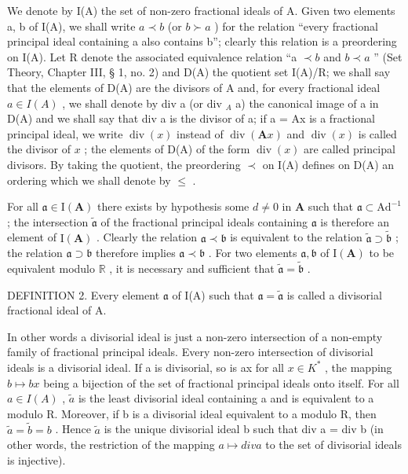 We denote by I(A) the set of non-zero fractional ideals of A. Given two elements a, b of I(A), we shall write \(a \prec b\) (or \(b \succ a\) ) for the relation ``every fractional principal ideal containing a also contains b''; clearly this relation is a preordering on I(A). Let R denote the associated equivalence relation ``a \(\prec b\) and \(b \prec a\) '' (Set Theory, Chapter III, § 1, no. 2) and D(A) the quotient set I(A)/R; we shall say that the elements of D(A) are the divisors of A and, for every fractional ideal \(a \in I(A)\) , we shall denote by div a (or div \(_{A}\) a) the canonical image of a in D(A) and we shall say that div a is the divisor of a; if a = Ax is a fractional principal ideal, we write \(\operatorname{div}(x)\) instead of \(\operatorname{div}(\mathbf{A}x)\) and \(\operatorname{div}(x)\) is called the divisor of \(x\) ; the elements of D(A) of the form \(\operatorname{div}(x)\) are called principal divisors. By taking the quotient, the preordering \(\prec\) on I(A) defines on D(A) an ordering which we shall denote by \(\leqslant\) .

For all \(\mathfrak{a} \in \mathrm{I}(\mathbf{A})\) there exists by hypothesis some \(d \neq 0\) in \(\mathbf{A}\) such that \(\mathfrak{a} \subset \mathrm{Ad}^{-1}\) ; the intersection \(\tilde{\mathfrak{a}}\) of the fractional principal ideals containing \(\mathfrak{a}\) is therefore an element of \(\mathrm{I}(\mathbf{A})\) . Clearly the relation \(\mathfrak{a} \prec \mathfrak{b}\) is equivalent to the relation \(\tilde{\mathfrak{a}} \supset \tilde{\mathfrak{b}}\) ; the relation \(\mathfrak{a} \supset \mathfrak{b}\) therefore implies \(\mathfrak{a} \prec \mathfrak{b}\) . For two elements \(\mathfrak{a}, \mathfrak{b}\) of \(\mathrm{I}(\mathbf{A})\) to be equivalent modulo \(\mathbb{R}\) , it is necessary and sufficient that \(\tilde{\mathfrak{a}} = \tilde{\mathfrak{b}}\) .

DEFINITION 2. Every element \(\mathfrak{a}\) of I(A) such that \(\mathfrak{a} = \tilde{\mathfrak{a}}\) is called a divisorial fractional ideal of A.

In other words a divisorial ideal is just a non-zero intersection of a non-empty family of fractional principal ideals. Every non-zero intersection of divisorial ideals is a divisorial ideal. If a is divisorial, so is ax for all \(x \in K^{*}\) , the mapping \(b \mapsto bx\) being a bijection of the set of fractional principal ideals onto itself. For all \(a \in I(A)\) , \(\tilde{a}\) is the least divisorial ideal containing a and is equivalent to a modulo R. Moreover, if b is a divisorial ideal equivalent to a modulo R, then \(\tilde{a} = \tilde{b} = b\) . Hence \(\tilde{a}\) is the unique divisorial ideal b such that div a = div b (in other words, the restriction of the mapping \(a \mapsto div a\) to the set of divisorial ideals is injective).

